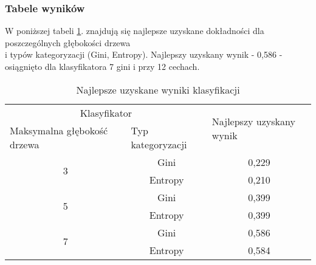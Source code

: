 \documentclass{article}
\begin{document}
\subsubsection{Tabele wyników}
\quad W poniższej tabeli \ref{tab:najlepsze_wyniki}. znajdują się najlepsze uzyskane dokładności dla poszczególnych głębokości drzewa\\ 
i typów kategoryzacji (Gini, Entropy). Najlepszy uzyskany wynik - 0,586 - osiągnięto dla klasyfikatora 7 gini i przy 12 cechach. 
\begin{center}
\begin{longtable}{|c|c|c|}
\caption{Najlepsze uzyskane wyniki klasyfikacji}
		\label{tab:najlepsze_wyniki}\\
\hline
\multicolumn{2}{|c|}{Klasyfikator}                                                         & \multicolumn{1}{l|}{\multirow{2}{*}{Najlepszy uzyskany wynik}} \\ \cline{1-2}
\multicolumn{1}{|l|}{Maksymalna głębokość drzewa} & \multicolumn{1}{l|}{Typ kategoryzacji} & \multicolumn{1}{l|}{}                                          \\ \hline
\multirow{2}{*}{3}                                & Gini                                   & 0,229                                                          \\ \cline{2-3} 
                                                  & Entropy                                & 0,210                                                         \\ \hline
\multirow{2}{*}{5}                                & Gini                                   & 0,399                                                          \\ \cline{2-3} 
                                                  & Entropy                                & 0,399                                                          \\ \hline
\multirow{2}{*}{7}                                & Gini                                   & 0,586                                                          \\ \cline{2-3} 
                                                  & Entropy                                & 0,584                                                          \\ \hline
        
\end{longtable}
\end{center}
\end{document}
